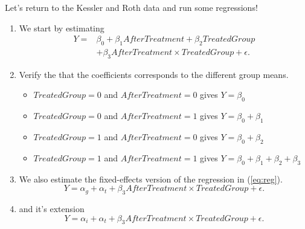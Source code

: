 \documentclass[notes,11pt, aspectratio=169]{beamer}
\begin{document}
\begin{frame}{Let's return to the Kessler and Roth data and run some regressions!}
\begin{enumerate}
\item We start by estimating 
\begin{align}\label{eq:reg}
Y = &\beta_0 + \beta_1 AfterTreatment + \beta_2 TreatedGroup\\ \nonumber 
&+ \beta_3 AfterTreatment \times TreatedGroup + \epsilon.  
\end{align}
\item Verify the that the coefficients corresponds to the different group means. 
 \begin{itemize}
    \item $TreatedGroup=0$ and $AfterTreatment=0$ gives $Y=\beta_0$ 
    \item $TreatedGroup=0$ and $AfterTreatment=1$ gives $Y=\beta_0 + \beta_1$ 
    \item $TreatedGroup=1$ and $AfterTreatment=0$ gives $Y=\beta_0 + \beta_2$ 
    \item $TreatedGroup=1$ and $AfterTreatment=1$ gives $Y=\beta_0+\beta_1+\beta_2+\beta_3$ 
    \end{itemize}
\item We also estimate the fixed-effects version of the regression in (\ref{eq:reg}).
\begin{equation}
Y = \alpha_g + \alpha_{t} + \beta_3 AfterTreatment \times TreatedGroup + \epsilon.
\end{equation}
\item and it's extension
\begin{equation}
Y = \alpha_i + \alpha_{t} + \beta_3 AfterTreatment \times TreatedGroup + \epsilon.
\end{equation}
\end{enumerate}
\end{frame}
\end{document}
